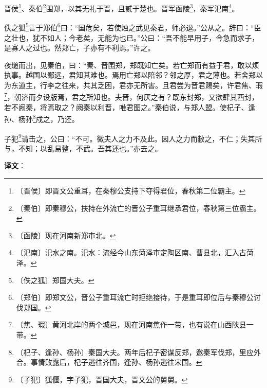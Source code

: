 \documentclass[12pt,UTF-8,openany]{ctexbook}
\begin{document}
\begin{normalsize}
    
    晋侯\footnote{〔晋侯〕即晋文公重耳，在秦穆公支持下夺得君位，春秋第二位霸主。}、秦伯\footnote{〔秦伯〕即秦穆公，扶持在外流亡的晋公子重耳继承君位，春秋第三位霸主。}围郑，以其无礼于晋，且贰于楚也。晋军函陵\footnote{〔函陵〕现在河南新郑市北。}，秦军氾南\footnote{〔氾南〕氾水之南。氾水：流经今山东菏泽市定陶区南、曹县北，汇入古菏泽。}。
    
    佚之狐\footnote{〔佚之狐〕郑国大夫。}言于郑伯\footnote{〔郑伯〕即郑文公，晋公子重耳流亡时拒绝接待，于是重耳即位后与秦穆公讨伐郑国。}曰：“国危矣，若使烛之武见秦君，师必退。”公从之。辞曰：“臣之壮也，犹不如人；今老矣，无能为也已。”公曰：“吾不能早用子，今急而求子，是寡人之过也。然郑亡，子亦有不利焉。”许之。
    
    夜缒而出，见秦伯，曰：“秦、晋围郑，郑既知亡矣。若亡郑而有益于君，敢以烦执事。越国以鄙远，君知其难也。焉用亡郑以陪邻？邻之厚，君之薄也。若舍郑以为东道主，行李之往来，共其乏困，君亦无所害。且君尝为晋君赐矣，许君焦、瑕\footnote{〔焦、瑕〕黄河北岸的两个城邑，现在河南焦作一带，也有说在山西陕县一带。}，朝济而夕设版焉，君之所知也。夫晋，何厌之有？既东封郑，又欲肆其西封，若不阙秦，将焉取之？阙秦以利晋，唯君图之。”秦伯说，与郑人盟。使杞子、逢孙、杨孙\footnote{〔杞子、逢孙、杨孙〕秦国大夫。两年后杞子密谋反郑，邀秦军伐郑，里应外合。事情败露后，杞子逃往齐国，逢孙、杨孙逃往宋国。}戍之，乃还。
    
    子犯\footnote{〔子犯〕狐偃，字子犯，晋国大夫，晋文公的舅舅。}请击之，公曰：“不可。微夫人之力不及此。因人之力而敝之，不仁；失其所与，不知；以乱易整，不武。吾其还也。”亦去之。
\end{normalsize}


\newpage

\textbf{译文}：

\vspace{1em}
\end{document}
